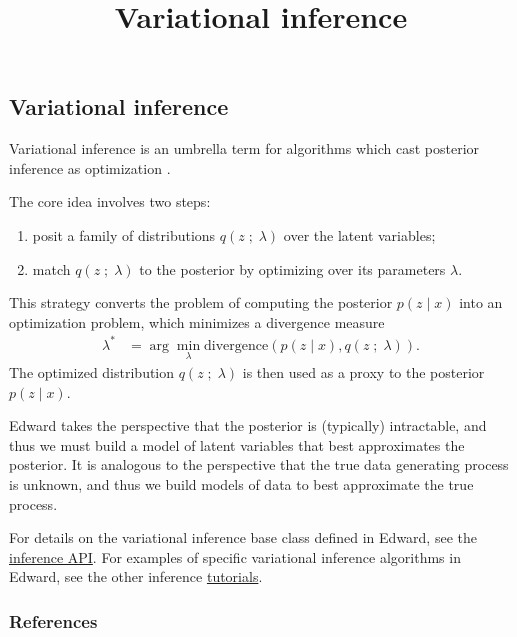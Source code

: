 \title{Variational inference}

\subsection{Variational inference}

Variational inference is an umbrella term for algorithms which cast
posterior inference as optimization
\citep{hinton1993keeping,waterhouse1996bayesian,jordan1999introduction}.

The core idea involves two steps:
\begin{enumerate}
   \item posit a family of distributions $q(z\;;\;\lambda)$ over the
   latent variables;
   \item match $q(z\;;\;\lambda)$ to the posterior by optimizing over its
   parameters $\lambda$.
 \end{enumerate}
This strategy converts the problem of computing the posterior $p(z \mid x)$ into
an optimization problem, which minimizes a divergence measure
\begin{align*}
  \lambda^*
  &=
  \arg\min_\lambda \text{divergence}(
  p(z \mid x)
  ,
  q(z\;;\;\lambda)
  ).
\end{align*}
The optimized distribution $q(z\;;\;\lambda)$ is then used as a
proxy to the posterior $p(z\mid x)$.

Edward takes the perspective that the posterior is (typically)
intractable, and thus we must build a model of latent variables that
best approximates the posterior.
It is analogous to the perspective
that the true data generating process is unknown, and thus we build
models of data to best approximate the true process.

For details on the variational inference base class defined in Edward,
see the \href{/api/inference}{inference API}.
For examples of specific variational inference algorithms in
Edward, see the other inference \href{/tutorials/}{tutorials}.

\subsubsection{References}\label{references}

